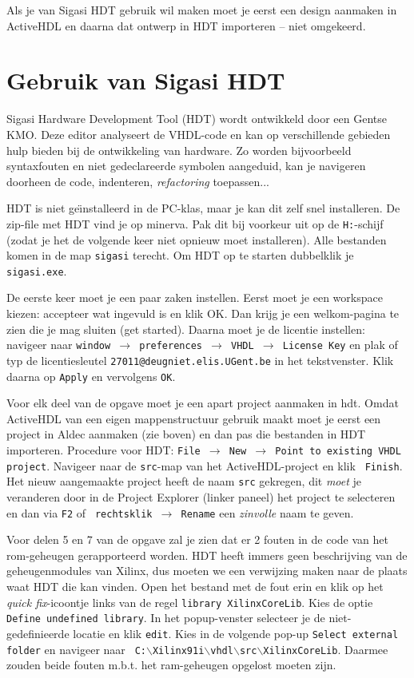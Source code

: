 Als je van Sigasi HDT gebruik wil maken moet je eerst een design
aanmaken in ActiveHDL en daarna dat ontwerp in HDT importeren -- niet
omgekeerd.

\section{Gebruik van Sigasi HDT}

Sigasi Hardware Development Tool (HDT) wordt ontwikkeld door een
Gentse KMO.  Deze editor analyseert de VHDL-code en kan op
verschillende gebieden hulp bieden bij de ontwikkeling van
hardware. Zo worden bijvoorbeeld syntaxfouten en niet gedeclareerde
symbolen aangeduid, kan je navigeren doorheen de code, indenteren,
{\em refactoring} toepassen...

HDT is niet ge\"{\i}nstalleerd in de PC-klas, maar je kan dit zelf
snel installeren. De zip-file met HDT vind je op minerva. Pak dit bij
voorkeur uit op de {\tt H:}-schijf (zodat je het de volgende keer niet
opnieuw moet installeren). Alle bestanden komen in de map {\tt sigasi}
terecht. Om HDT op te starten dubbelklik je {\tt sigasi.exe}.

De eerste keer moet je een paar zaken instellen. Eerst moet je een
workspace kiezen: accepteer wat ingevuld is en klik OK. Dan krijg je
een welkom-pagina te zien die je mag sluiten (get started). Daarna
moet je de licentie instellen: navigeer naar {\tt window $\rightarrow$
preferences $\rightarrow$ VHDL $\rightarrow$ License Key} en plak of
typ de licentiesleutel {\tt 27011@deugniet.elis.UGent.be} in het
tekstvenster. Klik daarna op {\tt Apply} en vervolgens {\tt OK}.

Voor elk deel van de opgave moet je een apart project aanmaken in
hdt. Omdat ActiveHDL van een eigen mappenstructuur gebruik maakt moet
je eerst een project in Aldec aanmaken (zie boven) en dan pas die
bestanden in HDT importeren. Procedure voor HDT: {\tt File
$\rightarrow$ New $\rightarrow$ Point to existing VHDL project}.
Navigeer naar de {\tt src}-map van het ActiveHDL-project en klik {\tt
Finish}. Het nieuw aangemaakte project heeft de naam {\tt src}
gekregen, dit {\em moet} je veranderen door in de Project Explorer
(linker paneel) het project te selecteren en dan via {\tt F2} of {\tt
rechtsklik $\rightarrow$ Rename} een {\em zinvolle} naam te geven.

Voor delen 5 en 7 van de opgave zal je zien dat er 2 fouten in de code
van het rom-geheugen gerapporteerd worden.  HDT heeft immers geen
beschrijving van de geheugenmodules van Xilinx, dus moeten we een
verwijzing maken naar de plaats waat HDT die kan vinden.  Open het
bestand met de fout erin en klik op het {\em quick fix}-icoontje links
van de regel {\tt library XilinxCoreLib}.  Kies de optie {\tt Define
undefined library}. In het popup-venster selecteer je de
niet-gedefinieerde locatie en klik {\tt edit}. Kies in de volgende
pop-up {\tt Select external folder} en navigeer naar {\tt
C:$\backslash$Xilinx91i$\backslash$vhdl$\backslash$src$\backslash$XilinxCoreLib}.
Daarmee zouden beide fouten m.b.t. het ram-geheugen opgelost moeten
zijn.

